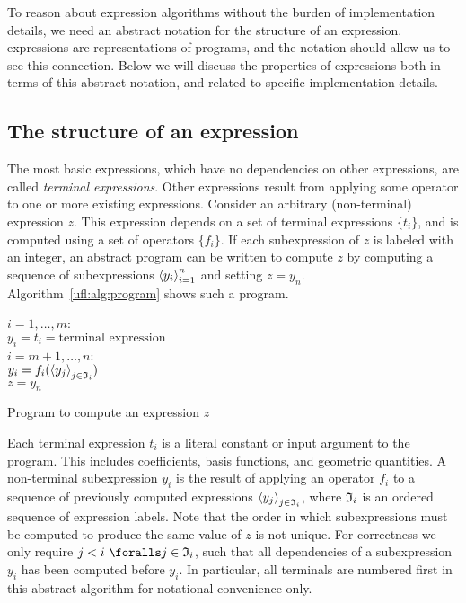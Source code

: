 To reason about expression algorithms without the burden of
implementation details, we need an abstract notation for the structure
of an expression.  \ufl{} expressions are representations of programs,
and the notation should allow us to see this connection. Below we will
discuss the properties of expressions both in terms of this abstract
notation, and related to specific implementation details.


\subsection{The structure of an expression} \label{ufl:sec:expressions}
The most basic expressions, which have no dependencies on other
expressions, are called \emph{terminal expressions}.  Other
expressions result from applying some operator to one or more existing
expressions.  Consider an arbitrary (non-terminal) expression $z$.
This expression depends on a set of terminal expressions $\{ t_i \}$,
and is computed using a set of operators $\{ f_i \}$.  If each
subexpression of $z$ is labeled with an integer, an abstract program
can be written to compute $z$ by computing a sequence of
subexpressions $\left\langle{y_i}\right\rangle_{i=1}^n$ and setting $z = y_n$.
Algorithm~\ref{ufl:alg:program} shows such a program.

\begin{algorithm}
\afor $i = 1, \ldots, m$:\\
\tab $ y_i =  t_i = \mbox{terminal expression}$ \\
\afor $i = m+1, \ldots, n$:\\
\tab $ y_i =  f_i(\left\langle{y_j}\right\rangle_{j\in\mathfrak{I}_i})$ \\
$z = y_n$
\caption{Program to compute an expression $z$}
\label{ufl:alg:program}
\end{algorithm}

Each terminal expression $t_i$ is a literal constant or input argument
to the program. This includes coefficients, basis functions, and
geometric quantities.  A non-terminal subexpression $y_i$ is the
result of applying an operator $f_i$ to a sequence of previously
computed expressions $\left\langle{y_j}\right\rangle_{j\in\mathfrak{I}_i}$, where $\mathfrak{I}_i$ is an
ordered sequence of expression labels.  Note that the order in which
subexpressions must be computed to produce the same value of $z$ is
not unique.  For correctness we only require $j < i \,\, \foralls j \in
\mI_i$, such that all dependencies of a subexpression $y_i$ has been
computed before $y_i$.  In particular, all terminals are numbered
first in this abstract algorithm for notational convenience only.

